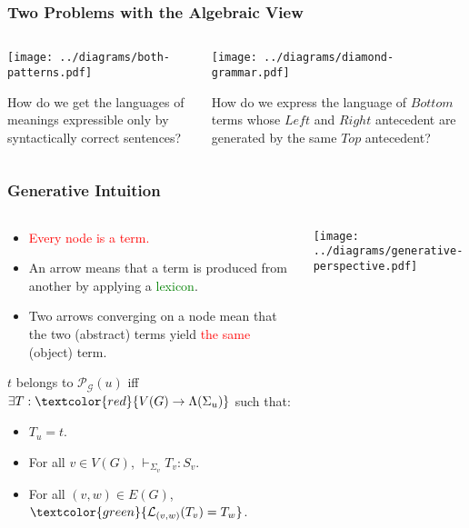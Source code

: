 \documentclass{beamer}
\begin{document}
\begin{frame}
  \frametitle{Two Problems with the Algebraic View}

  \begin{columns}[t]
    \begin{column}{0.5\textwidth}
      \texttt{[image: ../diagrams/both-patterns.pdf]}

      How do we get the languages of meanings expressible only by
      syntactically correct sentences?
    \end{column}
    \begin{column}{0.5\textwidth}
      \texttt{[image: ../diagrams/diamond-grammar.pdf]}

      How do we express the language of $Bottom$ terms whose $Left$ and
      $Right$ antecedent are generated by the same $Top$ antecedent?
    \end{column}
  \end{columns}
\end{frame}


\begin{frame}
  \frametitle{Generative Intuition}

  \begin{columns}[c]
    \begin{column}{0.7\textwidth}
      \begin{itemize}
      \item \textcolor{red}{Every node is a term.}
      \item An arrow means that a term is produced from another by
        applying a \textcolor{green}{lexicon}.
      \item Two arrows converging on a node mean that the two (abstract)
        terms yield \textcolor{red}{the same} (object) term.
      \end{itemize}

      \vspace{3 mm}

      $t$ belongs to $\mathcal{P}_{\mathcal{G}}(u)$ iff \\$\exists T :
      \textcolor{red}{V(G) \to \Lambda(\Sigma_u)}$ such that:
      \begin{itemize}
      \item $T_u = t$.
      \item For all $v \in V(G)$, $\vdash_{\Sigma_v} T_v : S_v$.
      \item For all $(v,w) \in E(G)$,
        $\textcolor{green}{\mathcal{L}_{(v,w)}(T_v) = T_w}$.
      \end{itemize}
    \end{column}
    \begin{column}{0.3\textwidth}
      \texttt{[image: ../diagrams/generative-perspective.pdf]}
    \end{column}
  \end{columns}
\end{frame}
\end{document}
